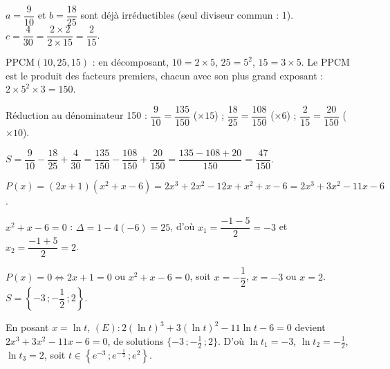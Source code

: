 \documentclass[11pt]{article}
\begin{document}

\begin{questions}
  \item $a = \dfrac{9}{10}$ et $b = \dfrac{18}{25}$ sont déjà irréductibles (seul diviseur commun : 1). $c = \dfrac{4}{30} = \dfrac{2\times 2}{2\times 15} = \dfrac{2}{15}$.
  \item $\mathrm{PPCM}(10, 25, 15)$ : en décomposant, $10 = 2\times 5$, $25 = 5^2$, $15 = 3\times 5$. Le PPCM est le produit des facteurs premiers, chacun avec son plus grand exposant : $2\times 5^2\times 3 = 150$.
  \item \begin{sousq}
    \item Réduction au dénominateur 150 : $\dfrac{9}{10} = \dfrac{135}{150}$ ($\times 15$) ; $\dfrac{18}{25} = \dfrac{108}{150}$ ($\times 6$) ; $\dfrac{2}{15} = \dfrac{20}{150}$ ($\times 10$).
    \item $S = \dfrac{9}{10} - \dfrac{18}{25} + \dfrac{4}{30} = \dfrac{135}{150} - \dfrac{108}{150} + \dfrac{20}{150} = \dfrac{135 - 108 + 20}{150} = \dfrac{47}{150}$.
  \end{sousq}
\end{questions}

\begin{questions}
  \item \begin{sousq}
    \item $P(x) = (2x+1)(x^2 + x - 6) = 2x^3 + 2x^2 - 12x + x^2 + x - 6 = 2x^3 + 3x^2 - 11x - 6$.
    \item $x^2 + x - 6 = 0$ : $\Delta = 1 - 4(-6) = 25$, d'où $x_1 = \dfrac{-1 - 5}{2} = -3$ et $x_2 = \dfrac{-1 + 5}{2} = 2$.
    \item $P(x) = 0 \Leftrightarrow 2x + 1 = 0$ ou $x^2 + x - 6 = 0$, soit $x = -\dfrac{1}{2}$, $x = -3$ ou $x = 2$. $S = \left\{-3\,;-\dfrac{1}{2}\,;2\right\}$.
  \end{sousq}
  \item En posant $x = \ln t$, $(E) : 2(\ln t)^3 + 3(\ln t)^2 - 11\ln t - 6 = 0$ devient $2x^3 + 3x^2 - 11x - 6 = 0$, de solutions $\{-3\,;-\tfrac{1}{2}\,;2\}$. D'où $\ln t_1 = -3$, $\ln t_2 = -\tfrac{1}{2}$, $\ln t_3 = 2$, soit $t \in \left\{e^{-3}\,;e^{-\frac{1}{2}}\,;e^{2}\right\}$.
\end{questions}
\end{document}
